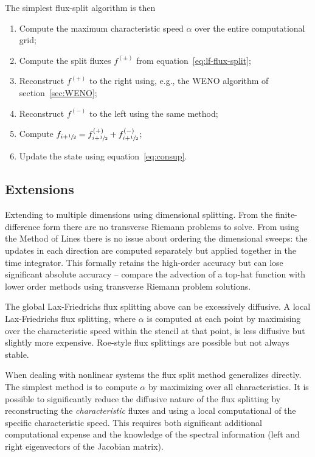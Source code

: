 The simplest flux-split algorithm is then
\begin{enumerate}
  \item Compute the maximum characteristic speed $\alpha$ over the entire computational grid;
  \item Compute the split fluxes $f^{(\pm)}$ from equation~\eqref{eq:lf-flux-split};
  \item Reconstruct $f^{(+)}$ to the right using, e.g., the WENO algorithm of section~\ref{sec:WENO};
  \item Reconstruct $f^{(-)}$ to the left using the same method;
  \item Compute $f_{i+{\sfrac{1}{2}}} = f^{(+)}_{i+{\sfrac{1}{2}}} + f^{(-)}_{i+{\sfrac{1}{2}}}$;
  \item Update the state using equation~\eqref{eq:consup}.
\end{enumerate}

\subsection{Extensions}

Extending to multiple dimensions using dimensional splitting. From the
finite-difference form there are no transverse Riemann problems to solve. From
using the Method of Lines there is no issue about ordering the dimensional
sweeps: the updates in each direction are computed separately but applied
together in the time integrator. This formally retains the high-order accuracy
but can lose significant absolute accuracy -- compare the advection of a
top-hat function with lower order methods using transverse Riemann problem
solutions.

The global Lax-Friedrichs flux splitting above can be excessively diffusive. A
local Lax-Friedrichs flux splitting, where $\alpha$ is computed at each point
by maximising over the characteristic speed within the stencil at that point, is
less diffusive but slightly more expensive. Roe-style flux splittings are
possible but not always stable.

When dealing with nonlinear systems the flux split method generalizes directly.
The simplest method is to compute $\alpha$ by maximizing over all
characteristics. It is possible to significantly reduce the diffusive nature of
the flux splitting by reconstructing the \emph{characteristic} fluxes and using
a local computational of the specific characteristic speed. This requires both
significant additional computational expense and the knowledge of the spectral
information (left and right eigenvectors of the Jacobian matrix).
